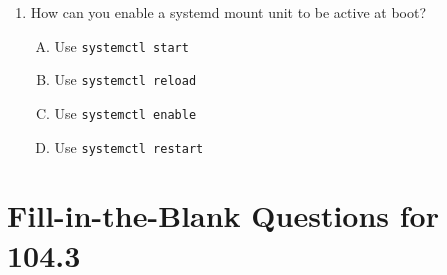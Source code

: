 \documentclass[a4paper]{report}
\begin{document}
\begin{enumerate}[1.]
    \item How can you enable a systemd mount unit to be active at boot?  
    \begin{enumerate}[A)]
        \item Use \texttt{systemctl start}  
        \item Use \texttt{systemctl reload}  
        \item Use \texttt{systemctl enable}  
        \item Use \texttt{systemctl restart}  
    \end{enumerate}

\end{enumerate}

\newpage
\section*{Fill-in-the-Blank Questions for 104.3}
\end{document}

